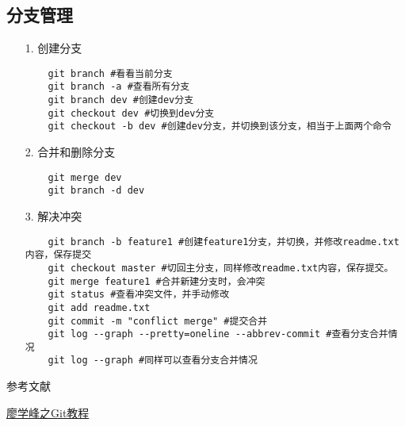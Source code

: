 \documentclass[a4paper,left=1.5cm,right=1.5cm,11pt]{article}
\def\hang{\hangindent\parindent}
\def\textindent#1{\indent\llap{#1\enspace}\ignorespaces}
\def\re{\par\hang\textindent}
\begin{document}
\subsection{分支管理}
\begin{itemize}
	\item[1.]创建分支
	\begin{lstlisting}
	git branch #看看当前分支
	git branch -a #查看所有分支
	git branch dev #创建dev分支
	git checkout dev #切换到dev分支
	git checkout -b dev #创建dev分支，并切换到该分支，相当于上面两个命令
	\end{lstlisting}
	\item[2.]合并和删除分支
	\begin{lstlisting}
	git merge dev
	git branch -d dev
	\end{lstlisting}
	\item[3.]解决冲突
	\begin{lstlisting}
	git branch -b feature1 #创建feature1分支，并切换，并修改readme.txt内容，保存提交
	git checkout master #切回主分支，同样修改readme.txt内容，保存提交。
	git merge feature1 #合并新建分支时，会冲突
	git status #查看冲突文件，并手动修改
	git add readme.txt 
	git commit -m "conflict merge" #提交合并
	git log --graph --pretty=oneline --abbrev-commit #查看分支合并情况
	git log --graph #同样可以查看分支合并情况
	\end{lstlisting}
\end{itemize}
\clearpage
\begin{center}
参考文献
\end{center}
\re{[1]} \href{http://www.liaoxuefeng.com/wiki/0013739516305929606dd18361248578c67b8067c8c017b000}{廖学峰之Git教程}  
\end{document}
